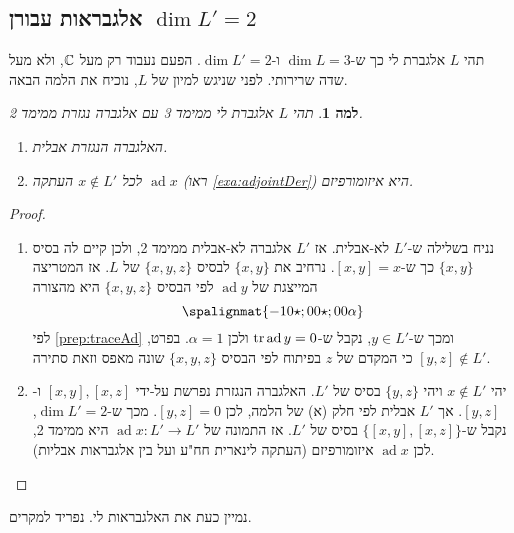 \documentclass{report}
\theoremstyle{break}
\newtheorem*{unLemma}{למה}
\theoremstyle{MyNonumberbreak}
\newtheorem{proof}{הוכחה}
\DeclareMathOperator{\ad}{ad} %
\begin{document}
\subsection{אלגבראות עבורן $\dim L' = 2$}
תהי $L$ אלגברת לי כך ש-$\dim L = 3$ ו-$\dim L' = 2$. הפעם נעבוד רק מעל $\operatorname{\mathbb{C}}$, ולא מעל שדה שרירותי. לפני שניגש למיון של $L$, נוכיח את הלמה הבאה. 
\begin{unLemma}
	תהי $L$ אלגברת לי ממימד 3 עם אלגברה נגזרת ממימד 2.
\begin{enumerate}[label=(\alph*)]
	\item 
	האלגברה הנגזרת אבלית.
	\item
	לכל $x \notin L'$ העתקה $\ad x$ (ראו \autoref*{exa:adjointDer}) היא איזומורפיזם.
\end{enumerate}
\end{unLemma}
\begin{proof}
\begin{enumerate}[label=(\alph*)]
	\item
	נניח בשלילה ש-$L'$ לא-אבלית. אז $L'$ אלגברה לא-אבלית ממימד 2, ולכן קיים לה בסיס $\{x, y\}$ כך ש-$[x, y] = x$. נרחיב את $\{x, y\}$ לבסיס $\{x, y, z\}$ של $L$. אז המטריצה המייצגת של $\ad y$ לפי הבסיס $\{x, y, z\}$ היא מהצורה
	\[ \spalignmat{-1 0 \star ; 0 0 \star ; 0 0 \alpha} \]
	לפי \autoref*{prep:traceAd} ומכך ש-$y \in L'$, נקבל ש-$\Tr\ad y = 0$ ולכן $\alpha = 1$. בפרט, $[y, z] \notin L'$ כי המקדם של $z$ בפיתוח לפי הבסיס $\{x, y, z\}$ שונה מאפס וזאת סתירה.
	\item
	יהי $x \notin L'$ ויהי $\{y, z\}$ בסיס של $L'$. האלגברה הנגזרת נפרשת על-ידי $[x, y], [x, z]$ ו-$[y, z]$. אך $L'$ אבלית לפי חלק (א) של הלמה, לכן $[y, z] = 0$. מכך ש-$\dim L' = 2$, נקבל ש-$\{[x, y], [x, z]\}$ בסיס של $L'$. אז התמונה של $\ad x : L' \to L'$ היא ממימד 2, לכן $\ad x$ איזומורפיזם (העתקה לינארית חח"ע ועל בין אלגבראות אבליות).
\end{enumerate}
\end{proof}
נמיין כעת את האלגבראות לי. נפריד למקרים.
\end{document}
